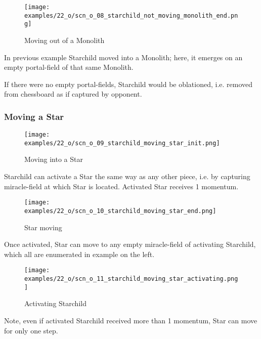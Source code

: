 \vspace*{5.1\baselineskip}
\noindent
\begin{wrapfigure}[8]{l}{0.4\textwidth}
\centering
\texttt{[image: examples/22\_o/scn\_o\_08\_starchild\_not\_moving\_monolith\_end.png]}
\caption{Moving out of a Monolith}
\label{fig:scn_o_08_starchild_not_moving_monolith_end}
\end{wrapfigure}
In previous example Starchild moved into a Monolith; here, it emerges on an empty
portal-field of that same Monolith.

If there were no empty portal-fields, Starchild would be oblationed, i.e. removed
from chessboard as if captured by opponent.

\clearpage %

\subsubsection*{Moving a Star}
\label{sec:One/Starchild/Movement/Moving a Star}

\noindent
\begin{wrapfigure}[5]{l}{0.4\textwidth}
\centering
\texttt{[image: examples/22\_o/scn\_o\_09\_starchild\_moving\_star\_init.png]}
\caption{Moving into a Star}
\label{fig:scn_o_09_starchild_moving_star_init}
\end{wrapfigure}
Starchild can activate a Star the same way as any other piece, i.e. by capturing
miracle-field at which Star is located. Activated Star receives 1 momentum.

\vspace*{2.1\baselineskip}
\noindent
\begin{wrapfigure}[4]{l}{0.4\textwidth}
\centering
\texttt{[image: examples/22\_o/scn\_o\_10\_starchild\_moving\_star\_end.png]}
\caption{Star moving}
\label{fig:scn_o_10_starchild_moving_star_end}
\end{wrapfigure}
Once activated, Star can move to any empty miracle-field of activating Starchild,
which all are enumerated in example on the left.

\vspace*{2.3\baselineskip}
\noindent
\begin{wrapfigure}[8]{l}{0.4\textwidth}
\centering
\texttt{[image: examples/22\_o/scn\_o\_11\_starchild\_moving\_star\_activating.png]}
\caption{Activating Starchild}
\label{fig:scn_o_11_starchild_moving_star_activating}
\end{wrapfigure}
Note, even if activated Starchild received more than 1 momentum, Star can move for
only one step.

